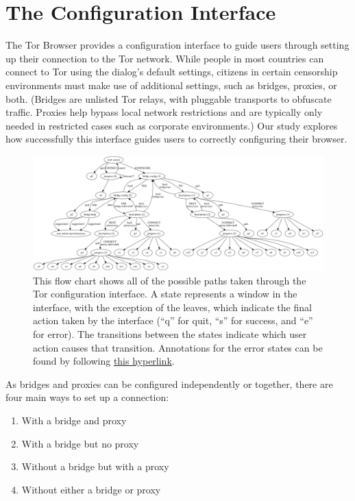 \documentclass{template}
\begin{document}
\section{The Configuration Interface}

The Tor Browser provides a configuration interface to guide users through setting up 
their connection to the
Tor network. While people in most countries can connect to Tor using the
dialog's default settings, citizens in certain censorship environments must
make use of additional settings, such as bridges, proxies, or both. 
(Bridges are unlisted Tor relays, with pluggable transports to obfuscate traffic.
Proxies help bypass local network restrictions and are typically only
needed in restricted cases such as corporate environments.)
Our study explores how successfully this interface guides users to
correctly configuring their browser.\\


\begin{figure}[t]
\label{fig:interface}
  \centering
    \includegraphics[width=\textwidth]{../torconfig.png}
    \caption{This flow chart shows all of the possible paths taken through the
    Tor configuration interface. A state represents a window in the interface,
    with the exception of the leaves, which indicate the final action taken by
    the interface (``q'' for quit, ``s'' for success, and ``e'' for error). The
    transitions between the states indicate which user action causes that
    transition. Annotations for the error states can be found by following
\href{https://github.com/lindanlee/circumvention-ux-tor/blob/master/torconfig.dot}{this hyperlink}.}
\end{figure}

As bridges and proxies can be configured independently or together, there are
four main ways to set up a connection:

\begin{enumerate} \itemsep1pt \parskip0pt 
    \item With a bridge and proxy
    \item With a bridge but no proxy
    \item Without a bridge but with a proxy
    \item Without either a bridge or proxy
\end{enumerate}
\end{document}
